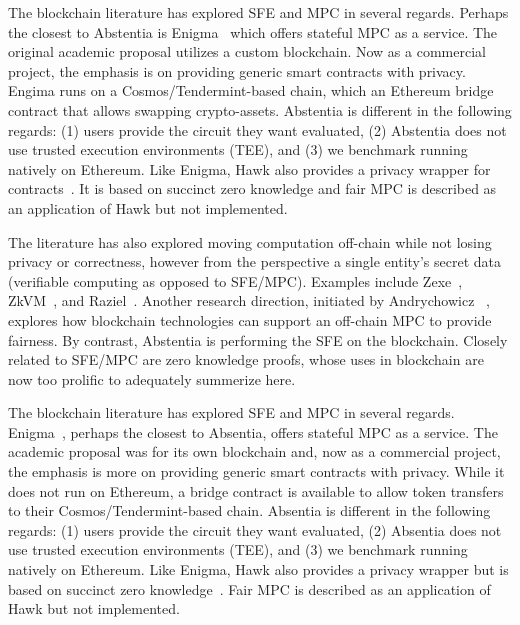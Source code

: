 The blockchain literature has explored SFE and MPC in several regards. Perhaps the closest to Abstentia is Enigma~\cite{zyskind2015enigma} which offers stateful MPC as a service. The original academic proposal utilizes a custom blockchain. Now as a commercial project, the emphasis is on providing generic smart contracts with privacy. Engima runs on a Cosmos/Tendermint-based chain, which an Ethereum bridge contract that allows swapping crypto-assets. Abstentia is different in the following regards: (1) users provide the circuit they want evaluated, (2) Abstentia does not use trusted execution environments (TEE), and (3) we benchmark running natively on Ethereum. Like Enigma, Hawk also provides a privacy wrapper for contracts~\cite{kosba2016hawk}. It is based on succinct zero knowledge and fair MPC is described as an application of Hawk but not implemented.  



The literature has also explored moving computation off-chain while not losing privacy or correctness, however from the perspective a single entity's secret data (\ie verifiable computing as opposed to SFE/MPC). Examples include Zexe~\cite{bowe2020zexe}, ZkVM~\cite{zkvm}, and Raziel~\cite{sanchez2018raziel}. Another research direction, initiated by Andrychowicz \etal~\cite{andrychowicz2014secure}, explores how blockchain technologies can support an off-chain MPC to provide fairness. By contrast, Abstentia is performing the SFE on the blockchain. Closely related to SFE/MPC are zero knowledge proofs, whose uses in blockchain are now too prolific to adequately summerize here.

The blockchain literature has explored SFE and MPC in several regards. Enigma~\cite{zyskind2015enigma}, perhaps the closest to Absentia, offers stateful MPC as a service. The academic proposal was for its own blockchain and, now as a commercial project, the emphasis is more on providing generic smart contracts with privacy. While it does not run on Ethereum, a bridge contract is available to allow token transfers to their Cosmos/Tendermint-based chain. Absentia is different in the following regards: (1) users provide the circuit they want evaluated, (2) Absentia does not use trusted execution environments (TEE), and (3) we benchmark running natively on Ethereum. Like Enigma, Hawk also provides a privacy wrapper but is based on succinct zero knowledge~\cite{kosba2016hawk}. Fair MPC is described as an application of Hawk but not implemented.  


